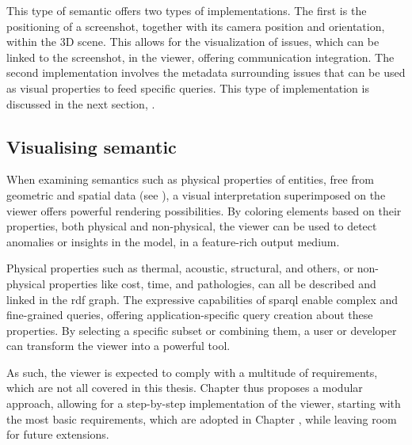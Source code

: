 This type of semantic offers two types of implementations. The first is the positioning of a screenshot, together with its camera position and orientation, within the 3D scene. This allows for the visualization of issues, which can be linked to the screenshot, in the viewer, offering communication integration. The second implementation involves the metadata surrounding issues that can be used as visual properties to feed specific queries. This type of implementation is discussed in the next section, .

\subsection{Visualising semantic} \label{sec:visualSemantic}
When examining semantics such as physical properties of entities, free from geometric and spatial data (see ), a visual interpretation superimposed on the viewer offers powerful rendering possibilities. By coloring elements based on their properties, both physical and non-physical, the viewer can be used to detect anomalies or insights in the model, in a feature-rich output medium.

Physical properties such as thermal, acoustic, structural, and others, or non-physical properties like cost, time, and pathologies, can all be described and linked in the \ac{rdf} graph. The expressive capabilities of \ac{sparql} enable complex and fine-grained queries, offering application-specific query creation about these properties. By selecting a specific subset or combining them, a user or developer can transform the viewer into a powerful tool.

As such, the viewer is expected to comply with a multitude of requirements, which are not all covered in this thesis. Chapter  thus proposes a modular approach, allowing for a step-by-step implementation of the viewer, starting with the most basic requirements, which are adopted in Chapter , while leaving room for future extensions.

